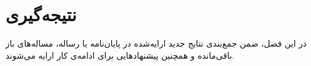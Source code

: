 
\chapter{نتیجه‌گیری}
در این فصل، ضمن جمع‌بندی نتایج جدید ارایه‌شده در پایان‌نامه یا رساله، مساله‌های باز باقی‌مانده و همچنین پیشنهادهایی برای ادامه‌ی کار ارایه می‌شوند.
